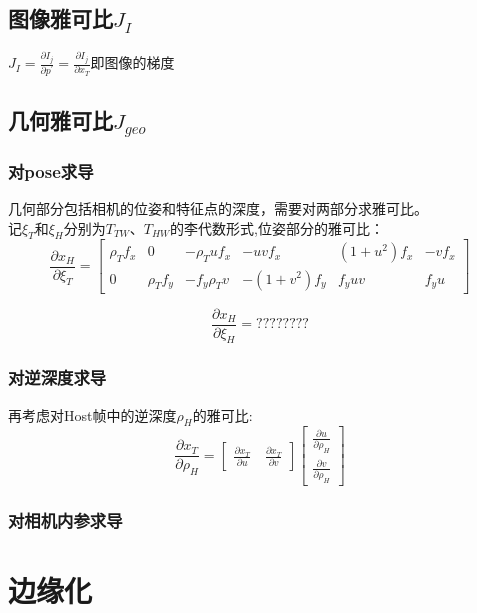 \subsection{图像雅可比$J_I$}
$J_I=\frac{\partial I_j}{\partial p^{'}}=\frac{\partial I_j}{\partial x_{T}}$即图像的梯度

\subsection{几何雅可比$J_{geo}$}

\subsubsection{对pose求导}
几何部分包括相机的位姿和特征点的深度，需要对两部分求雅可比。\\
\indent 记$\xi_{T}$和$\xi_{H}$分别为$T_{TW}$、$T_{HW}$的李代数形式,位姿部分的雅可比：
\begin{equation}
	\frac{\partial x_{H}}{\partial \xi_{T}}=
	\left[	
	\begin{matrix}
		\rho_{T}f_{x} & 0 & -\rho_{T}uf_{x} & -uvf_{x} & (1+u^2)f_{x} & -vf_{x} \\
		0 & \rho_{T}f_{y} & -f_{y}\rho_{T}v & -(1+v^2)f_{y} & f_{y}uv & f_{y}u  
	\end{matrix}	
	\right]
\end{equation}

\begin{equation}
\frac{\partial x_{H}}{\partial \xi_{H}}= ????????
\end{equation}

\subsubsection{对逆深度求导}
再考虑对Host帧中的逆深度$\rho_{H}$的雅可比:
\begin{equation}
\frac{\partial x_T}{\partial \rho_H}=
\left[ \begin{matrix}
\frac{\partial x_{T}}{\partial u} \quad \frac{\partial x_{T}}{\partial v}
\end{matrix}
\right]
\left[
\begin{matrix}
\frac{\partial u}{\partial \rho_{H}}\\
\frac{\partial v}{\partial \rho_{H}}
\end{matrix}
\right]
\end{equation}

\subsubsection{对相机内参求导}





\section{边缘化}
